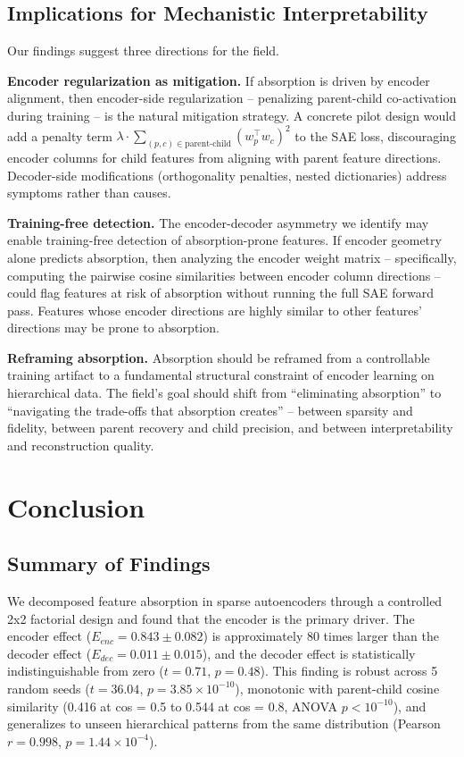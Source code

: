 \documentclass{article}
\begin{document}
\subsection{Implications for Mechanistic Interpretability}

Our findings suggest three directions for the field.

\textbf{Encoder regularization as mitigation.} If absorption is driven by encoder alignment, then encoder-side regularization -- penalizing parent-child co-activation during training -- is the natural mitigation strategy. A concrete pilot design would add a penalty term $\lambda \cdot \sum_{(p,c) \in \text{parent-child}} (w_p^\top w_c)^2$ to the SAE loss, discouraging encoder columns for child features from aligning with parent feature directions. Decoder-side modifications (orthogonality penalties, nested dictionaries) address symptoms rather than causes.

\textbf{Training-free detection.} The encoder-decoder asymmetry we identify may enable training-free detection of absorption-prone features. If encoder geometry alone predicts absorption, then analyzing the encoder weight matrix -- specifically, computing the pairwise cosine similarities between encoder column directions -- could flag features at risk of absorption without running the full SAE forward pass. Features whose encoder directions are highly similar to other features' directions may be prone to absorption.

\textbf{Reframing absorption.} Absorption should be reframed from a controllable training artifact to a fundamental structural constraint of encoder learning on hierarchical data. The field's goal should shift from ``eliminating absorption'' to ``navigating the trade-offs that absorption creates'' -- between sparsity and fidelity, between parent recovery and child precision, and between interpretability and reconstruction quality.

\section{Conclusion}

\subsection{Summary of Findings}

We decomposed feature absorption in sparse autoencoders through a controlled 2x2 factorial design and found that the encoder is the primary driver. The encoder effect ($E_{enc} = 0.843 \pm 0.082$) is approximately 80 times larger than the decoder effect ($E_{dec} = 0.011 \pm 0.015$), and the decoder effect is statistically indistinguishable from zero ($t = 0.71$, $p = 0.48$). This finding is robust across 5 random seeds ($t = 36.04$, $p = 3.85 \times 10^{-10}$), monotonic with parent-child cosine similarity (0.416 at cos = 0.5 to 0.544 at cos = 0.8, ANOVA $p < 10^{-10}$), and generalizes to unseen hierarchical patterns from the same distribution (Pearson $r = 0.998$, $p = 1.44 \times 10^{-4}$).
\end{document}
